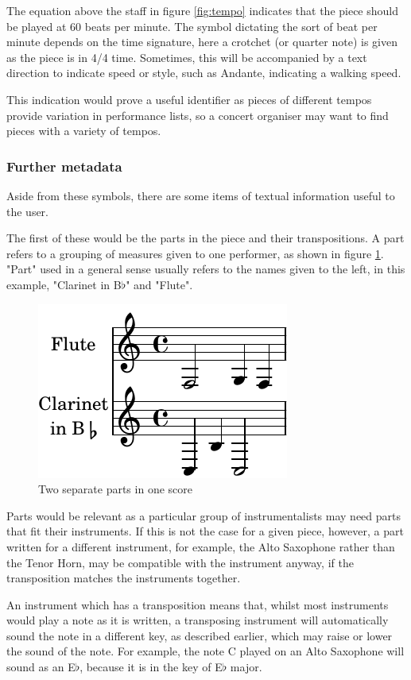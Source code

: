 The equation above the staff in figure \ref{fig:tempo} indicates that the piece should be played at 60 beats per minute. The symbol dictating the sort of beat per minute depends on the time signature, here a crotchet (or quarter note) is given as the piece is in 4/4 time. Sometimes, this will be accompanied by a text direction to indicate speed or style, such as Andante, indicating a walking speed.

This indication would prove a useful identifier as pieces of different tempos provide variation in performance lists, so a concert organiser may want to find pieces with a variety of tempos.

\subsubsection{Further metadata}
Aside from these symbols, there are some items of textual information useful to the user. 

The first of these would be the parts in the piece and their transpositions. A part refers to a grouping of measures given to one performer, as shown in figure \ref{fig:parts}. "Part" used in a general sense usually refers to the names given to the left, in this example, "Clarinet in B$\flat$" and "Flute".
\begin{figure}[H]
\centering
\includegraphics{multiparts-crop}
\caption{Two separate parts in one score}
\label{fig:parts}	
\end{figure}



Parts would be relevant as a particular group of instrumentalists may need parts that fit their instruments. If this is not the case for a given piece, however, a part written for a different instrument, for example, the Alto Saxophone rather than the Tenor Horn, may be compatible with the instrument anyway, if the transposition matches the instruments together. 

An instrument which has a transposition means that, whilst most instruments would play a note as it is written, a transposing instrument will automatically sound the note in a different key, as described earlier, which may raise or lower the sound of the note. For example, the note C played on an Alto Saxophone will sound as an E$\flat$, because it is in the key of E$\flat$ major. 

